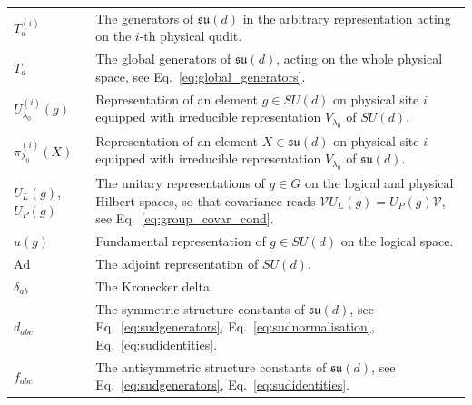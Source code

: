 \documentclass[10pt,twocolumn,superscriptaddress,aps,amsmath,amssymb,citeautoscript,floatfix,prx]{revtex4-2}
\theoremstyle{plain}
\theoremstyle{plain}
\theoremstyle{plain}
\theoremstyle{plain}
\theoremstyle{plain}
\theoremstyle{plain}
\theoremstyle{plain}
\theoremstyle{definition}
\theoremstyle{plain}
\begin{document}
\begin{appendix}
\begin{tabular}{@{}ll@{}}
\parbox[t]{0.22\textwidth}{$T_a^{(i)}$} & \parbox[t]{0.72\textwidth}{The generators of $\mathfrak{su}(d)$ in the arbitrary representation acting on the $i$-th physical qudit.} \\[0.6em]

\parbox[t]{0.22\textwidth}{$T_a$} & \parbox[t]{0.72\textwidth}{The global generators of $\mathfrak{su}(d)$, acting on the whole physical space, see Eq.~\eqref{eq:global_generators}.} \\[0.6em]

\parbox[t]{0.22\textwidth}{$U_{\lambda_0}^{(i)}(g)$} & \parbox[t]{0.72\textwidth}{Representation of an element $g\in SU(d)$ on physical site $i$ equipped with irreducible representation $V_{\lambda_0}$ of $SU(d)$.} \\[0.6em]

\parbox[t]{0.22\textwidth}{$\pi_{\lambda_0}^{(i)}(X)$} & \parbox[t]{0.72\textwidth}{Representation of an element $X\in \mathfrak{su}(d)$ on physical site $i$ equipped with irreducible representation $V_{\lambda_0}$ of $\mathfrak{su}(d)$.} \\[0.6em]

\parbox[t]{0.22\textwidth}{$U_L(g)$, $U_P(g)$} & \parbox[t]{0.72\textwidth}{The unitary representations of $g\in G$ on the logical and physical Hilbert spaces, so that covariance reads $\mathcal{V}U_L(g)=U_P(g)\mathcal{V}$, see Eq.~\eqref{eq:group_covar_cond}.} \\[0.6em]

\parbox[t]{0.22\textwidth}{$u(g)$} & \parbox[t]{0.72\textwidth}{Fundamental representation of $g\in SU(d)$ on the logical space.} \\[0.6em]

\parbox[t]{0.22\textwidth}{$\mathrm{Ad}$} & \parbox[t]{0.72\textwidth}{The adjoint representation of $SU(d)$.} \\[0.6em]

\parbox[t]{0.22\textwidth}{$\delta_{a b}$} & \parbox[t]{0.72\textwidth}{The Kronecker delta.} \\[0.6em]

\parbox[t]{0.22\textwidth}{$d_{abc}$} & \parbox[t]{0.72\textwidth}{The symmetric structure constants of $\mathfrak{su}(d)$, see Eq.~\eqref{eq:sudgenerators}, Eq.~\eqref{eq:sudnormalisation}, Eq.~\eqref{eq:sudidentities}.} \\[0.6em]

\parbox[t]{0.22\textwidth}{$f_{abc}$} & \parbox[t]{0.72\textwidth}{The antisymmetric structure constants of $\mathfrak{su}(d)$, see Eq.~\eqref{eq:sudgenerators}, Eq.~\eqref{eq:sudidentities}.} \\[0.6em]


\end{tabular}
\end{appendix}
\end{document}
